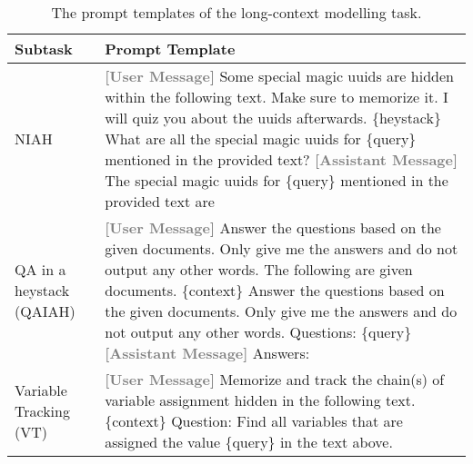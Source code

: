 \begin{table*}
    \caption{The prompt templates of the long-context modelling task.}
    \label{tab:ruler_prompts}
    \vskip 0.15in
    \centering
    \small
    \begin{tabularx}{\textwidth}{l|X}
    \toprule
    Subtask & Prompt Template \\
    \midrule
    NIAH & \textbf{\textcolor{gray}{[User Message]}}\newline
    Some special magic uuids are hidden within the following text. Make sure to memorize it. I will quiz you about the uuids afterwards.\newline
    \{heystack\}\newline
    What are all the special magic uuids for \{query\} mentioned in the provided text?\newline
    \textbf{\textcolor{gray}{[Assistant Message]}}\newline
    The special magic uuids for \{query\} mentioned in the provided text are \\
    \midrule
    QA in a heystack (QAIAH) & \textbf{\textcolor{gray}{[User Message]}}\newline
    Answer the questions based on the given documents. Only give me the answers and do not output any other words.\newline\newline
    The following are given documents.\newline\newline
    \{context\}\newline\newline
    Answer the questions based on the given documents. Only give me the answers and do not output any other words.\newline\newline
    Questions:\newline
    \{query\}
    \textbf{\textcolor{gray}{[Assistant Message]}}\newline
    Answers:\\
    \midrule
    Variable Tracking (VT) & \textbf{\textcolor{gray}{[User Message]}}\newline
    Memorize and track the chain(s) of variable assignment hidden in the following text.\newline\newline
    \{context\}\newline
    Question: Find all variables that are assigned the value \{query\} in the text above.\newline

\end{tabularx}
\end{table*}
